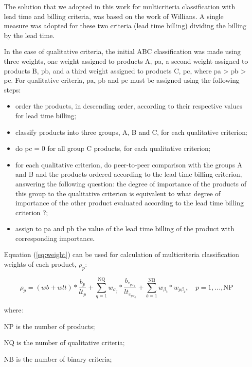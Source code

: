 \documentclass[10pt,fleqn,a4paper,twoside]{article}
\begin{document}
	The solution that we adopted in this work for multicriteria classification with lead time and billing criteria, was based on the work of Willians. A single measure was adopted for these two criteria (lead time billing) dividing the billing by the lead time.

In the case of qualitative criteria, the initial ABC classification was made using three weights, one weight assigned to products A, pa, a second weight assigned to products B, pb, and a third weight assigned to products C, pc, where pa > pb > pc. For qualitative criteria, pa, pb and pc must be assigned using the following steps:
	
\begin{itemize}
\item order the products, in descending order, according to their respective values for lead time billing;
\item classify products into three groups, A, B and C, for each qualitative criterion;
\item do pc = 0 for all group C products, for each qualitative criterion;
\item for each qualitative criterion, do peer-to-peer comparison with the groups A and B and the products ordered according to the lead time billing criterion, answering the following question: the degree of importance of the products of this group to the qualitative criterion is equivalent to what degree of importance of the other product evaluated according to the lead time billing criterion ?;
\item assign to pa and pb the value of the lead time billing of the product with corresponding importance.
\end{itemize}	

Equation (\ref{eq:weight}) can be used for calculation of multicriteria classification weights of each product, $\rho_{p}$:

\begin{equation}
	\label{eq:weight}
	\rho_{p} = (wb + wlt) * \frac{b_p}{lt_p} + \sum_{q=1}^{\textrm{NQ}}{w_{\sigma_q}*\frac{b_{e_{p\sigma_q}}}{lt_{e_{p\sigma_q}}}} + \sum_{b=1}^{\textrm{NB}}{w_{\beta_b}*w_{p\beta_b}}, \quad p= 1,...,\textrm{NP}
\end{equation}

where:

$\textrm{NP}$ is the number of products;

$\textrm{NQ}$ is the number of qualitative criteria;

$\textrm{NB}$ is the number of binary criteria;
\end{document}
